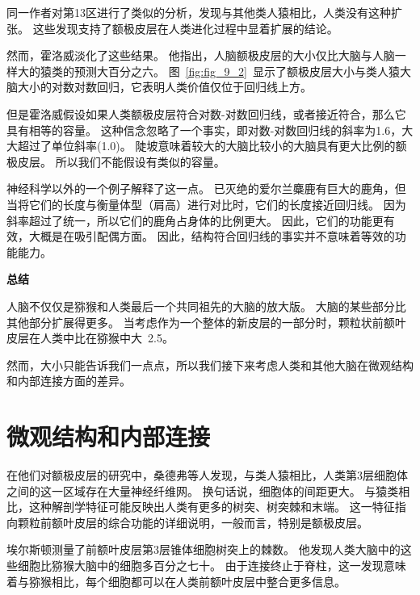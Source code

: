 \par

同一作者对第13区进行了类似的分析，发现与其他类人猿相比，人类没有这种扩张。
这些发现支持了额极皮层在人类进化过程中显着扩展的结论。


然而，霍洛威\cite{holloway2002brief}淡化了这些结果。
他指出，人脑额极皮层的大小仅比大脑与人脑一样大的猿类的预测大百分之六。
图~\ref{fig:fig_9_2}~显示了额极皮层大小与类人猿大脑大小的对数对数回归\cite{semendeferi2001prefrontal}，它表明人类价值仅位于回归线上方。
\par


但是霍洛威\cite{holloway2002brief}假设如果人类额极皮层符合对数-对数回归线，或者接近符合，那么它具有相等的容量。
这种信念忽略了一个事实，即对数-对数回归线的斜率为1.6，大大超过了单位斜率(1.0)。
陡坡意味着较大的大脑比较小的大脑具有更大比例的额极皮层。
所以我们不能假设有类似的容量。


神经科学以外的一个例子解释了这一点\cite{gould1973positive}。
已灭绝的爱尔兰麋鹿有巨大的鹿角，但当将它们的长度与衡量体型（肩高）进行对比时，它们的长度接近回归线。
因为斜率超过了统一，所以它们的鹿角占身体的比例更大。
因此，它们的功能更有效，大概是在吸引配偶方面。
因此，结构符合回归线的事实并不意味着等效的功能能力。
\par



\textbf{总结}
\par

人脑不仅仅是猕猴和人类最后一个共同祖先的大脑的放大版。
大脑的某些部分比其他部分扩展得更多。
当考虑作为一个整体的新皮层的一部分时，颗粒状前额叶皮层在人类中比在猕猴中大~2.5。
\par


然而，大小只能告诉我们一点点，所以我们接下来考虑人类和其他大脑在微观结构和内部连接方面的差异。



\section{微观结构和内部连接}

在他们对额极皮层的研究中，桑德弗等人\cite{semendeferi2011spatial}发现，与类人猿相比，人类第3层细胞体之间的这一区域存在大量神经纤维网。
换句话说，细胞体的间距更大。
与猿类相比，这种解剖学特征可能反映出人类有更多的树突、树突棘和末端。
这一特征指向颗粒前额叶皮层的综合功能的详细说明，一般而言，特别是额极皮层。
\par


埃尔斯顿\cite{elston2001pyramidal}测量了前额叶皮层第3层锥体细胞树突上的棘数。
他发现人类大脑中的这些细胞比猕猴大脑中的细胞多百分之七十。
由于连接终止于脊柱，这一发现意味着与猕猴相比，每个细胞都可以在人类前额叶皮层中整合更多信息。
\par


